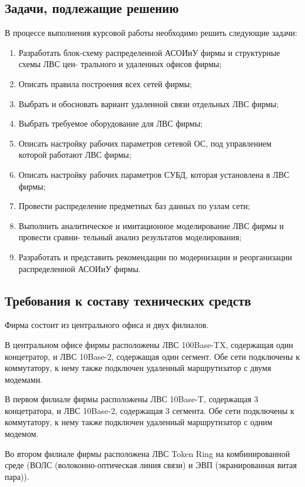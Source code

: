 \documentclass[russian,utf8,emptystyle]{eskdtext}
\begin{document}
\subsection{Задачи, подлежащие решению}
В процессе выполнения курсовой работы необходимо решить следующие задачи:
\begin{enumerate}[label=\arabic*.]
\item Разработать блок-схему распределенной АСОИиУ фирмы и структурные схемы ЛВС цен-
трального и удаленных офисов фирмы;
\item Описать правила построения всех сетей фирмы;
\item Выбрать и обосновать вариант удаленной связи отдельных ЛВС фирмы;
\item Выбрать требуемое оборудование для ЛВС фирмы;
\item Описать настройку рабочих параметров сетевой ОС, под управлением которой работают ЛВС
фирмы;
\item Описать настройку рабочих параметров СУБД, которая установлена в ЛВС фирмы;
\item Провести распределение предметных баз данных по узлам сети;
\item Выполнить аналитическое и имитационное моделирование ЛВС фирмы и провести сравни-
тельный анализ результатов моделирования;
\item Разработать и представить рекомендации по модернизации и реорганизации распределенной
АСОИиУ фирмы.
\end{enumerate}


\subsection{Требования к составу технических средств}
Фирма состоит из центрального офиса и двух филиалов.

В центральном офисе фирмы расположены ЛВС 100Base-TX, содержащая один концетратор, и ЛВС 10Base-2, содержащая один сегмент. Обе сети подключены к коммутатору, к нему также подключен удаленный маршрутизатор с двумя модемами. 

В первом филиале фирмы расположены ЛВС 10Base-T, содержащая 3 концетратора, и ЛВС 10Base-2, содержащая 3 сегмента. Обе сети подключены к коммутатору, к нему также подключен удаленный маршрутизатор с одним модемом.

Во втором филиале фирмы расположена ЛВС Token Ring на комбинированной среде (ВОЛС (волоконно-оптическая линия связи) и ЭВП (экранированная витая пара)). 
\end{document}
